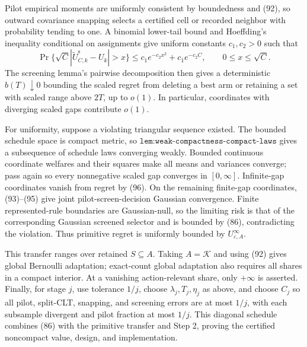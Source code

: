 Pilot empirical moments are uniformly consistent by boundedness and (92), so outward covariance snapping selects a certified cell or recorded neighbor with probability tending to one.  A binomial lower-tail bound and Hoeffding's inequality conditional on assignments give uniform constants \(c_1,c_2>0\) such that
\[
\Pr\{\sqrt C|\widetilde U_{C,k}^{\mathrm s}-U_k|>x\}
\leq c_1e^{-c_2x^2}+c_1e^{-c_2C},\qquad0\leq x\leq\sqrt C. \tag{96}
\]
The screening lemma's pairwise decomposition then gives a deterministic \(b(T)\downarrow0\) bounding the scaled regret from deleting a best arm or retaining a set with scaled range above \(2T\), up to \(o(1)\).  In particular, coordinates with diverging scaled gaps contribute \(o(1)\).

For uniformity, suppose a violating triangular sequence existed.  The bounded schedule space is compact metric, so \(\texttt{lem:weak-compactness-compact-laws}\) gives a subsequence of schedule laws converging weakly.  Bounded continuous coordinate welfares and their squares make all means and variances converge; pass again so every nonnegative scaled gap converges in \([0,\infty]\).  Infinite-gap coordinates vanish from regret by (96).  On the remaining finite-gap coordinates, (93)--(95) give joint pilot-screen-decision Gaussian convergence.  Finite represented-rule boundaries are Gaussian-null, so the limiting risk is that of the corresponding Gaussian screened selector and is bounded by (86), contradicting the violation.  Thus primitive regret is uniformly bounded by \(U^\infty_{\varepsilon,A}\).

This transfer ranges over retained \(S\subseteq A\).  Taking \(A=\mathcal K\) and using (92) gives global Bernoulli adaptation; exact-count global adaptation also requires all shares in a compact interior.  At a vanishing action-relevant share, only \(+\infty\) is asserted.  Finally, for stage \(j\), use tolerance \(1/j\), choose \(\lambda_j,T_j,\eta_j\) as above, and choose \(C_j\) so all pilot, split-CLT, snapping, and screening errors are at most \(1/j\), with each subsample divergent and pilot fraction at most \(1/j\).  This diagonal schedule combines (86) with the primitive transfer and Step 2, proving the certified noncompact value, design, and implementation.